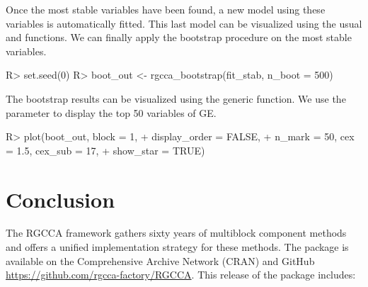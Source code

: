 \documentclass[
]{jss}
\begin{document}
\normalsize

Once the most stable variables have been found, a new model using these
variables is automatically fitted. This last model can be visualized
using the usual  and  functions. We can
finally apply the bootstrap procedure on the most stable variables.

\footnotesize

\begin{CodeChunk}
\begin{CodeInput}
R> set.seed(0)
R> boot_out <- rgcca_bootstrap(fit_stab, n_boot = 500)
\end{CodeInput}
\end{CodeChunk}

\normalsize

The bootstrap results can be visualized using the generic 
function. We use the  parameter to display the top 50
variables of GE.

\footnotesize

\begin{CodeChunk}
\begin{CodeInput}
R> plot(boot_out, block = 1,
+      display_order = FALSE,
+      n_mark = 50, cex = 1.5, cex_sub = 17,
+      show_star = TRUE)
\end{CodeInput}
\end{CodeChunk}

\normalsize

\section{Conclusion}\label{conclusion}

The RGCCA framework gathers sixty years of multiblock component methods
and offers a unified implementation strategy for these methods. The
 package is available on the Comprehensive 
Archive Network (CRAN) and GitHub
\url{https://github.com/rgcca-factory/RGCCA}. This release of the
 package includes:
\end{document}
